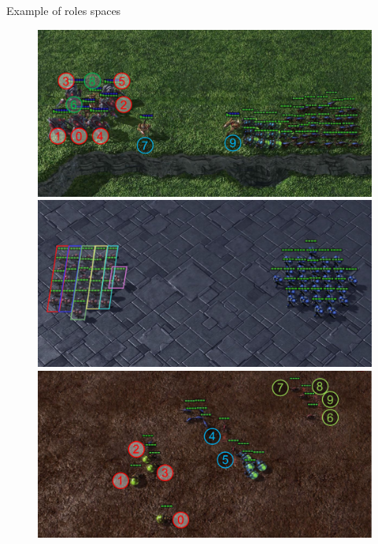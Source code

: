 \documentclass{beamer}
\begin{document}
    \begin{frame}{Example of roles spaces}
        \begin{figure}
            \centering
            \includegraphics[width=0.32\linewidth]{img/fig-various_roles/various_roles-g1.pdf}\hfill
            \includegraphics[width=0.32\linewidth]{img/fig-various_roles/various_roles-g2.pdf}\hfill
            \includegraphics[width=0.32\linewidth]{img/fig-various_roles/various_roles-g3.pdf}
            \hfill
            \hfill
        \end{figure}


    \end{frame}
\end{document}

